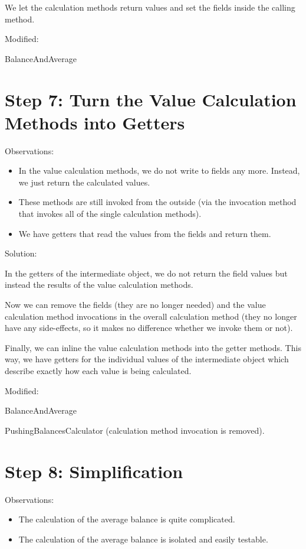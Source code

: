 \documentclass[a4paper,fleqn,titlepage,11pt]{article}
\begin{document}
We let the calculation methods return values and set the fields inside the calling method.

Modified:

BalanceAndAverage

\section*{Step 7: Turn the Value Calculation Methods into Getters}

Observations:
\begin{itemize}
\item In the value calculation methods, we do not write to fields any more. Instead, we just return the calculated values.
\item These methods are still invoked from the outside (via the invocation method that invokes all of the single calculation methods).
\item We have getters that read the values from the fields and return them.
\end{itemize}

Solution:

In the getters of the intermediate object, we do not return the field values but instead the results of the value calculation methods.

Now we can remove the fields (they are no longer needed) and the value calculation method invocations in the overall calculation method (they no longer have any side-effects, so it makes no difference whether we invoke them or not).

Finally, we can inline the value calculation methods into the getter methods. This way, we have getters for the individual values of the intermediate object which describe exactly how each value is being calculated.

Modified:

BalanceAndAverage

PushingBalancesCalculator (calculation method invocation is removed).

\section*{Step 8: Simplification}

Observations:
\begin{itemize}
\item The calculation of the average balance is quite complicated.
\item The calculation of the average balance is isolated and easily testable.
\end{itemize}
\end{document}
